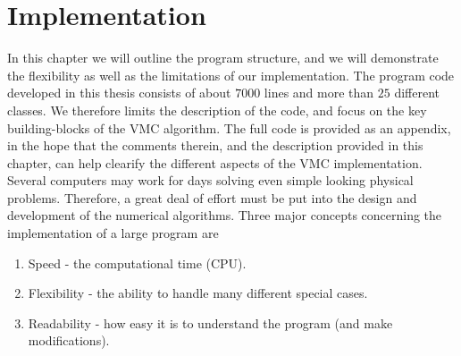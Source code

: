 \chapter{Implementation}
\label{Implementation}

In this chapter we will outline the program structure, and we will
demonstrate the flexibility as well as the limitations of our
implementation. The program code developed in this thesis consists of
about $7000$ lines and more than $25$ different classes. We therefore
limits the description of the code, and focus on the key
building-blocks of the VMC algorithm. The full code is provided as an
appendix, in the hope that the comments therein, and
the description provided in this chapter, can help clearify the
different aspects of the VMC implementation.
\newline
%
\newline
Several computers may work for days solving even simple looking
physical problems. Therefore, a great deal of effort must be
put into the design and development of the numerical algorithms.
Three major concepts concerning the implementation of a
large program are

\begin{enumerate}
  \item{} Speed       - the computational time (CPU).
  \item{} Flexibility - the ability to handle many different special cases.
  \item{} Readability - how easy it is to understand the program (and
  make modifications).
\end{enumerate}

